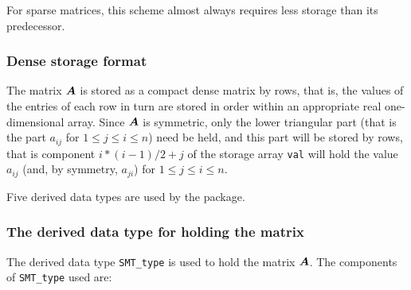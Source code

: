\documentclass{galahad}
\begin{document}
For sparse matrices, this scheme almost always requires less storage than
its predecessor.

\subsubsection{Dense storage format}\label{dense}
The matrix ${\bm{A}}$ is stored as a compact
dense matrix by rows, that is, the values of the entries of each row in turn are
stored in order within an appropriate real one-dimensional array.
Since ${\bm{A}}$ is symmetric, only the lower triangular part (that is the part
$a_{ij}$ for $1 \leq j \leq i \leq n$) need be held, and this part will be
stored by rows, that is component
$i \ast (i-1)/2 + j$ of the storage array {\tt val}
will hold the value $a_{ij}$ (and, by symmetry, $a_{ji}$)
for $1 \leq j \leq i \leq n$.









\galtypes
Five derived data types are used by the package.


\subsubsection{The derived data type for holding the matrix}\label{typeprob}
The derived data type {\tt SMT\_type} is used to hold the matrix ${\bm{A}}$.
The components of {\tt SMT\_type} used are:
\end{document}
